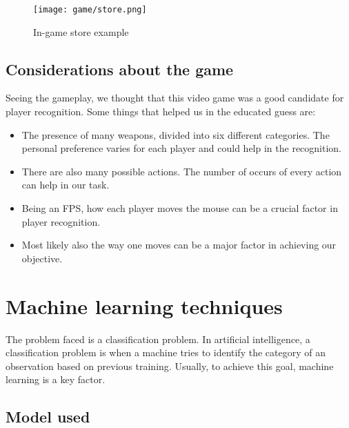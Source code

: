 	\begin{figure}[!h] 
		\centering 
		\texttt{[image: game/store.png]}
		\caption{\label{fig:store}In-game store example}
	\end{figure}
	
	
	\subsection{Considerations about the game}
		
		Seeing the gameplay, we thought that this video game was a good candidate for player recognition. 
		Some things that helped us in the educated guess are:
		
		\begin{itemize}
		
			\item The presence of many weapons, divided into six different categories. 
			The personal preference varies for each player and could help in the recognition. 
			\item There are also many possible actions. The number of occurs of every action can help in our task. 
			\item Being an FPS, how each player moves the mouse can be a crucial factor in player recognition.
			\item Most likely also the way one moves can be a major factor in achieving our objective.
		
		\end{itemize} 


\section{\label{sec:ml}Machine learning techniques}

	The problem faced is a classification problem. 
	In artificial intelligence, a classification problem is when a machine tries to identify the category of an observation based on previous training. 
	Usually, to achieve this goal, machine learning is a key factor.
	
	\subsection{Model used}
	
